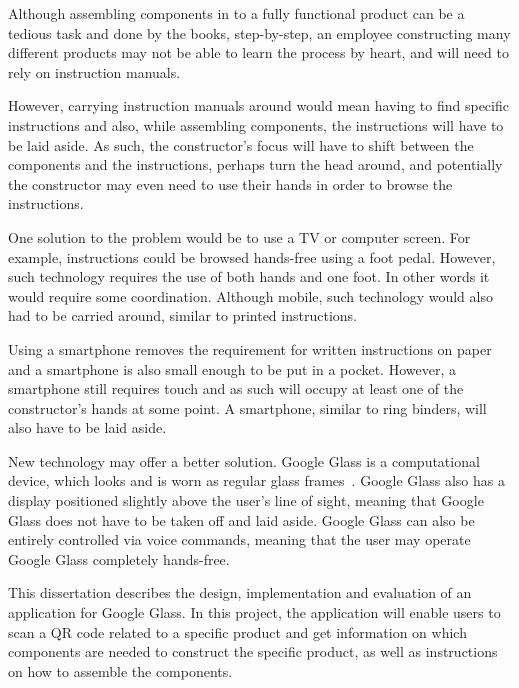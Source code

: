 %
%
%
%
%

Although assembling components in to a fully functional product can be a tedious task and done by the books, step-by-step, an employee constructing many different products may not be able to learn the process by heart, and will need to rely on instruction manuals.

However, carrying instruction manuals around would mean having to find specific instructions and also, while assembling components, the instructions will have to be laid aside. As such, the constructor's focus will have to shift between the components and the instructions, perhaps turn the head around, and potentially the constructor may even need to use their hands in order to browse the instructions. 

One solution to the problem would be to use a TV or computer screen. For example, instructions could be browsed hands-free using a foot pedal. However, such technology requires the use of both hands and one foot. In other words it would require some coordination. Although mobile, such technology would also had to be carried around, similar to printed instructions.

Using a smartphone removes the requirement for written instructions on paper and a smartphone is also small enough to be put in a pocket. However, a smartphone still requires touch and as such will occupy at least one of the constructor's hands at some point. A smartphone, similar to ring binders, will also have to be laid aside.

New technology may offer a better solution. Google Glass is a computational device, which looks and is worn as regular glass frames~\cite{glassStart}. Google Glass also has a display positioned slightly above the user's line of sight, meaning that Google Glass does not have to be taken off and laid aside. Google Glass can also be entirely controlled via voice commands, meaning that the user may operate Google Glass completely hands-free.

This dissertation describes the design, implementation and evaluation of an application for Google Glass. In this project, the application will enable users to scan a QR code related to a specific product and get information on which components are needed to construct the specific product, as well as instructions on how to assemble the components.

